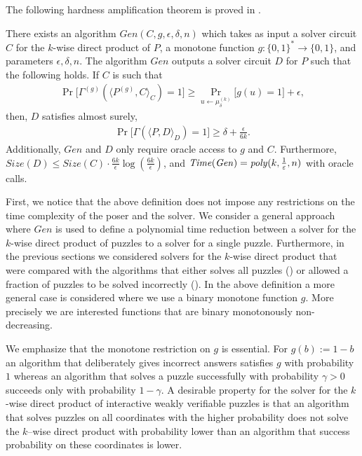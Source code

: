 The following hardness amplification theorem is proved in \cite{DBLP:journals/corr/abs-1002-3534}.
\begin{theorem}
There exists an algorithm $\mathit{Gen}(C,g,\epsilon, \delta, n)$ which takes as input a solver circuit $C$ for the $k$-wise
direct product of $P$, a monotone function $g: \{0,1\}^{*} \rightarrow \{0,1\}$, and parameters $\epsilon,\delta,n$.
The algorithm $\mathit{Gen}$ outputs a solver circuit $D$ for $P$ such that the following holds.
If $C$ is such that
\begin{align*}
\Pr\Big[\Gamma^{(g)}(\langle P^{(g)}, C \rangle_C) = 1\Big] \geq \Pr_{u \leftarrow \mu_{\delta}^{(k)}} \Big[ g(u) = 1 \Big] + \epsilon,
\end{align*}
then, $D$ satisfies almost surely,
\begin{align*}
  \Pr\Big[ \Gamma(\langle P, D\rangle_{D}) = 1\Big] \geq \delta + \frac{\epsilon}{6k}.
\end{align*}
Additionally, $\mathit{Gen}$ and $D$ only require oracle access to $g$ and $C$.
Furthermore, $\mathit{Size}(D) \leq \mathit{Size}(C) \cdot \frac{6k}{\epsilon} \log(\frac{6k}{\epsilon})$,
and $\operatorname{\mathit{Time}} (\mathit{Gen}) = \operatorname{\mathit{poly}}(k, \frac{1}{\varepsilon}, n)$ with oracle calls.
\end{theorem}

First, we notice that the above definition does not impose any restrictions on the time complexity of the poser and the solver.
We consider a general approach where $\mathit{Gen}$ is used to define a polynomial time reduction between a solver for the $k$-wise
direct product of puzzles to a solver for a single puzzle.
Furthermore, in the previous sections we considered solvers for the $k$-wise direct product that were compared with the algorithms that either
solves all puzzles (\cite{canetti2004hardness}) or allowed a fraction of puzzles to be solved incorrectly (\cite{Dodis:2009:SAI:1530441.1530450}).
In the above definition a more general case is considered where we use a binary monotone function $g$.
More precisely we are interested functions that are binary monotonously non-decreasing.

We emphasize that the monotone restriction on $g$ is essential. For $g(b) := 1 - b$ an algorithm that
deliberately gives incorrect answers satisfies $g$ with probability $1$ whereas an algorithm that solves a puzzle successfully with probability
$\gamma > 0$ succeeds only with probability $1 - \gamma$.
A desirable property for the solver for the $k$-wise direct product of interactive weakly verifiable puzzles is that
an algorithm that solves puzzles on all coordinates with the higher probability
does not solve the $k$--wise direct product with probability lower than an algorithm
that success probability on these coordinates is lower.

